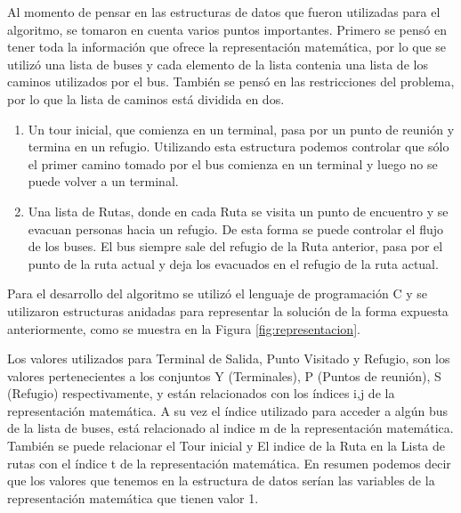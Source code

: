 \documentclass[letter, 10pt]{article}
\begin{document}
Al momento de pensar en las estructuras de datos que fueron utilizadas para el algoritmo, se tomaron en cuenta varios puntos importantes. Primero se pensó en tener toda la información que ofrece la representación matemática, por lo que se utilizó una lista de buses y cada elemento de la lista contenia una lista de los caminos utilizados por el bus. También se pensó en las restricciones del problema, por lo que la lista de caminos está dividida en dos.

\begin{enumerate}
    \item Un tour inicial, que comienza en un terminal, pasa por un punto de reunión y termina en un refugio. Utilizando esta estructura podemos controlar que sólo el primer camino tomado por el bus comienza en un terminal y luego no se puede volver a un terminal.

    \item Una lista de Rutas, donde en cada Ruta se visita un punto de encuentro y se evacuan personas hacia un refugio. De esta forma se puede controlar el flujo de los buses. El bus siempre sale del refugio de la Ruta anterior, pasa por el punto de la ruta actual y deja los evacuados en el refugio de la ruta actual. 
    
\end{enumerate}

Para el desarrollo del algoritmo se utilizó el lenguaje de programación C y se utilizaron estructuras anidadas para representar la solución de la forma expuesta anteriormente, como se muestra en la Figura \ref{fig:representacion}.

Los valores utilizados para Terminal de Salida, Punto Visitado y Refugio, son los valores pertenecientes a los conjuntos Y (Terminales), P (Puntos de reunión), S (Refugio) respectivamente, y están relacionados con los índices i,j de la representación matemática. A su vez el índice utilizado para acceder a algún bus de la lista de buses, está relacionado al indice m de la representación matemática. También se puede relacionar el Tour inicial y El indice de la Ruta en la Lista de rutas con el índice t de la representación matemática. En resumen podemos decir que los valores que tenemos en la estructura de datos serían las variables de la representación matemática que tienen valor 1.
\end{document}
